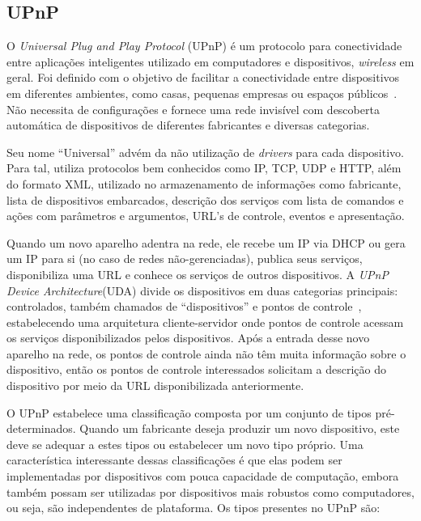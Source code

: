 \subsection{UPnP}
O \emph{Universal Plug and Play Protocol} (UPnP) é um protocolo para conectividade entre aplicações inteligentes utilizado em computadores e dispositivos, \emph{wireless} em geral. Foi definido com o objetivo de facilitar a conectividade entre dispositivos em diferentes ambientes, como casas, pequenas empresas ou espaços públicos~\cite{upnpArch}. Não necessita de configurações e fornece uma rede invisível com descoberta automática de dispositivos de diferentes fabricantes e diversas categorias.

Seu nome ``Universal'' advém da não utilização de \emph{drivers} para cada dispositivo. Para tal, utiliza protocolos bem conhecidos como IP, TCP, UDP e HTTP, além do formato XML, utilizado no armazenamento de informações como fabricante, lista de dispositivos embarcados, descrição dos serviços com lista de comandos e ações com parâmetros e argumentos, URL's de controle, eventos e apresentação.

Quando um novo aparelho adentra na rede, ele recebe um IP via DHCP ou gera um IP para si (no caso de redes não-gerenciadas), publica seus serviços, disponibiliza uma URL e conhece os serviços de outros dispositivos. A \emph{UPnP Device Architecture}(UDA) divide os dispositivos em duas categorias principais: controlados, também chamados de ``dispositivos'' e pontos de controle~\cite{upnpArch}, estabelecendo uma arquitetura cliente-servidor onde pontos de controle acessam os serviços disponibilizados pelos dispositivos. Após a entrada desse novo aparelho na rede, os pontos de controle ainda não têm muita informação sobre o dispositivo, então os pontos de controle interessados solicitam a descrição do dispositivo por meio da URL disponibilizada anteriormente.

O UPnP estabelece uma classificação composta por um conjunto de tipos pré-determinados. Quando um fabricante deseja produzir um novo dispositivo, este deve se adequar a estes tipos ou estabelecer um novo tipo próprio. Uma característica interessante dessas classificações é que elas podem ser implementadas por dispositivos com pouca capacidade de computação, embora também possam ser utilizadas por dispositivos mais robustos como computadores, ou seja, são independentes de plataforma. Os tipos presentes no UPnP são:

